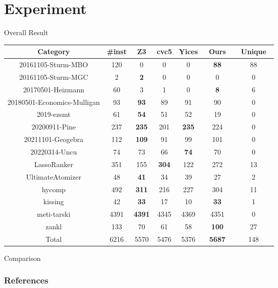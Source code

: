 \section{Experiment}
\begin{frame}{Overall Result}
    \begin{table}[!t]
        \centering
        \small
        \begin{tabular}{c | c | c | c | c | c | c}
                    Category & \#inst & Z3 & cvc5 & Yices & ~Ours~ & ~Unique~ \\ \hline
                    20161105-Sturm-MBO & 120 & 0 & 0 & 0 & \textbf{88} & 88 \\
                    20161105-Sturm-MGC & 2 & \textbf{2} & 0 & 0 & 0 & 0 \\
                    20170501-Heizmann & 60 & 3 & 1 & 0 & \textbf{8} & 6 \\
                    20180501-Economics-Mulligan & 93 & \textbf{93} & 89 & 91 & 90 & 0 \\
                    2019-ezsmt & 61 & \textbf{54} & 51 & 52 & 19 & 0 \\
                    20200911-Pine & 237 & \textbf{235} & 201 & \textbf{235} & 224 & 0 \\
                    20211101-Geogebra & 112 & \textbf{109} & 91 & 99 & 101 & 0 \\
                    20220314-Uncu & 74 & 73 & 66 & \textbf{74} & 70 & 0 \\
                    LassoRanker & 351 & 155 & \textbf{304} & 122 & 272 & 13\\
                    UltimateAtomizer & 48 & \textbf{41} & 34 & 39 & 27 & 2 \\
                    hycomp & 492 & \textbf{311} & 216 & 227 & 304 & 11 \\
                    kissing & 42 & \textbf{33} & 17 & 10 & \textbf{33} & 1 \\
                    meti-tarski & 4391 & \textbf{4391} & 4345 & 4369 & 4351 & 0 \\
                    zankl & 133 & 70 & 61 & 58 & \textbf{100} & 27 \\ \hline
                    Total & 6216 & 5570 & 5476 & 5376 & \textbf{5687} & 148 
                \end{tabular}
        \end{table}
\end{frame}

\begin{frame}{Comparison}

\end{frame}

\begin{frame}[allowframebreaks]
    \frametitle{References}
\printbibliography
\end{frame}